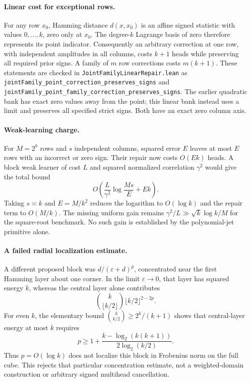 \documentclass{article}
\begin{document}
\paragraph{Linear cost for exceptional rows.}
For any row $x_0$, Hamming distance $d(x,x_0)$ is an affine signed
statistic with values $0,\ldots,k$, zero only at $x_0$. The degree-$k$
Lagrange basis of zero therefore represents its point indicator.
Consequently an arbitrary correction at one row, with independent
amplitudes in all columns, costs $k+1$ heads while preserving all required
prior signs. A family of $m$ row corrections costs $m(k+1)$.
These statements are checked in \texttt{JointFamilyLinearRepair.lean} as
\texttt{jointFamily\_point\_correction\_preserves\_signs} and
\texttt{jointFamily\_point\_family\_correction\_preserves\_signs}.
The earlier quadratic bank has exact zero values away from the point;
this linear bank instead uses a limit and preserves all specified strict
signs. Both have an exact zero column axis.

\paragraph{Weak-learning charge.}
For $M=2^k$ rows and $s$ independent columns, squared error $E$ leaves at
most $E$ rows with an incorrect or zero sign. Their repair now costs
$O(Ek)$ heads. A block weak learner of cost $L$ and squared normalized
correlation $\gamma^2$ would give the total bound
\[
 O\left(\frac{L}{\gamma^2}\log\frac{Ms}{E}+Ek\right).
\]
Taking $s\asymp k$ and $E=M/k^2$ reduces the logarithm to $O(\log k)$
and the repair term to $O(M/k)$. The missing uniform gain remains
$\gamma^2/L\gg\sqrt{k}\log k/M$ for the square-root benchmark.
No such gain is established by the polynomial-jet primitive alone.

\paragraph{A failed radial localization estimate.}
A different proposed block was $d/(\varepsilon+d)^p$, concentrated near
the first Hamming layer about one corner. In the limit
$\varepsilon\to0$, that layer has squared energy $k$, whereas the central
layer alone contributes
\[
 \binom{k}{\lfloor k/2\rfloor}\lfloor k/2\rfloor^{2-2p}.
\]
For even $k$, the elementary bound
$\binom{k}{k/2}\geq2^k/(k+1)$ shows that central-layer energy at most $k$
requires
\[
 p\geq1+\frac{k-\log_2(k(k+1))}{2\log_2(k/2)}.
\]
Thus $p=O(\log k)$ does not localize this block in Frobenius norm on the
full cube. This rejects that particular concentration estimate, not a
weighted-domain construction or arbitrary signed multihead cancellation.
\end{document}
